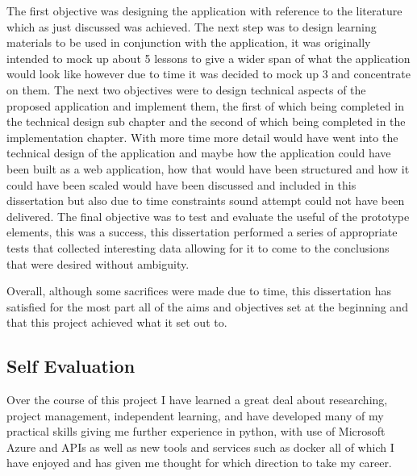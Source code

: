 \documentclass[12pt,a4paper]{article}
\begin{document}
The first objective was designing the application with reference to the literature which as just discussed was achieved. The next step was to design learning materials to be used in conjunction with the application, it was originally intended to mock up about 5 lessons to give a wider span of what the application would look like however due to time it was decided to mock up 3 and concentrate on them. The next two objectives were to design technical aspects of the proposed application and implement them, the first of which being completed in the technical design sub chapter and the second of which being completed in the implementation chapter. With more time more detail would have went into the technical design of the application and maybe how the application could have been built as a web application, how that would have been structured and how it could have been scaled would have been discussed and included in this dissertation but also due to time constraints sound attempt could not have been delivered. The final objective was to test and evaluate the useful of the prototype elements, this was a success, this dissertation performed a series of appropriate tests that collected interesting data allowing for it to come to the conclusions that were desired without ambiguity.  

Overall, although some sacrifices were made due to time, this dissertation has satisfied for the most part all of the aims and objectives set at the beginning and that this project achieved what it set out to.


\subsection{Self Evaluation}  

Over the course of this project I have learned a great deal about researching, project management, independent learning, and have developed many of my practical skills giving me further experience in python, with use of Microsoft Azure and APIs as well as new tools and services such as docker all of which I have enjoyed and has given me thought for which direction to take my career. 
\end{document}

